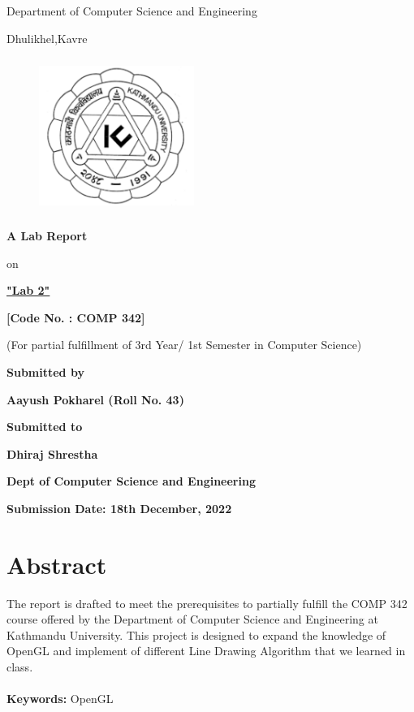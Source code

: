 \documentclass[12pt]{article}
\begin{document}
\thispagestyle{empty}

\section*{}
 {\LARGE{}}

\centerline{Department of Computer Science and Engineering}
\centerline{Dhulikhel,Kavre}
\begin{figure}[h]
    \centerline{\includegraphics[width=50.546mm,height=50.546mm]{KU_Logo.png}}
\end{figure}

\centerline{\textbf{A Lab Report}}
\centerline{on}
\centerline{\underline{\textbf{"Lab 2"}}}

\vspace*{12mm}

\centerline{\textbf{[Code No. : COMP 342]}}
\centerline{(For partial fulfillment of 3rd Year/ 1st Semester in Computer Science)}

\vspace*{20mm}

\centerline{\textbf{Submitted by}}
\centerline{\textbf{Aayush Pokharel (Roll No. 43)}}


\vspace*{26mm}


\centerline{\textbf{Submitted to}}
\centerline{\textbf{Dhiraj Shrestha}}
\centerline{\textbf{Dept of Computer Science and Engineering}}

\vspace*{20mm}

\centerline{\textbf{Submission Date: 18th December, 2022}}



\clearpage
\thispagestyle{empty}

\section*{Abstract}
The report is drafted to meet the prerequisites to partially fulfill the COMP 342 course offered by the
Department of Computer Science and Engineering at Kathmandu University. This project is designed
to expand the knowledge of OpenGL and implement of different Line Drawing Algorithm that we learned in class.
\\\\
\textbf{Keywords:} OpenGL
\end{document}
